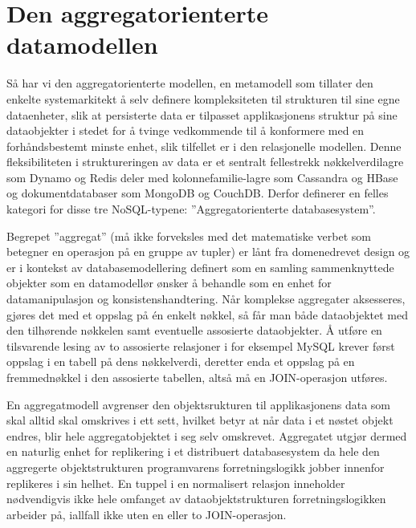 \section{Den aggregatorienterte datamodellen}

Så har vi den aggregatorienterte modellen, en metamodell som tillater den enkelte systemarkitekt å selv definere kompleksiteten til strukturen til sine egne dataenheter, slik at persisterte data er tilpasset applikasjonens struktur på sine dataobjekter i stedet for å tvinge vedkommende til å konformere med en forhåndsbestemt minste enhet, slik tilfellet er i den relasjonelle modellen. Denne fleksibiliteten i struktureringen av data er et sentralt fellestrekk nøkkelverdilagre som Dynamo og Redis deler med kolonnefamilie-lagre som Cassandra og HBase og dokumentdatabaser som MongoDB og CouchDB. Derfor definerer \cite{sadalage2013} en felles kategori for disse tre NoSQL-typene: ''Aggregatorienterte databasesystem''.

Begrepet ''aggregat'' (må ikke forveksles med det matematiske verbet som betegner en operasjon på en gruppe av tupler) er lånt fra domenedrevet design og er i kontekst av databasemodellering definert som en samling sammenknyttede objekter som en datamodellør ønsker å behandle som en enhet for datamanipulasjon og konsistenshandtering. Når komplekse aggregater aksesseres, gjøres det med et oppslag på én enkelt nøkkel, så får man både dataobjektet med den tilhørende nøkkelen samt eventuelle assosierte dataobjekter. Å utføre en tilsvarende lesing av to assosierte relasjoner i for eksempel MySQL krever først oppslag i en tabell på dens nøkkelverdi, deretter enda et oppslag på en fremmednøkkel i den assosierte tabellen, altså må en JOIN-operasjon utføres.

En aggregatmodell avgrenser den objektsrukturen til applikasjonens data som skal alltid skal omskrives i ett sett, hvilket betyr at når data i et nøstet objekt endres, blir hele aggregatobjektet i seg selv omskrevet. Aggregatet utgjør dermed en naturlig enhet for replikering i et distribuert databasesystem da hele den aggregerte objektstrukturen programvarens forretningslogikk jobber innenfor replikeres i sin helhet. En tuppel i en normalisert relasjon inneholder nødvendigvis ikke hele omfanget av dataobjektstrukturen forretningslogikken arbeider på, iallfall ikke uten en eller to JOIN-operasjon.

